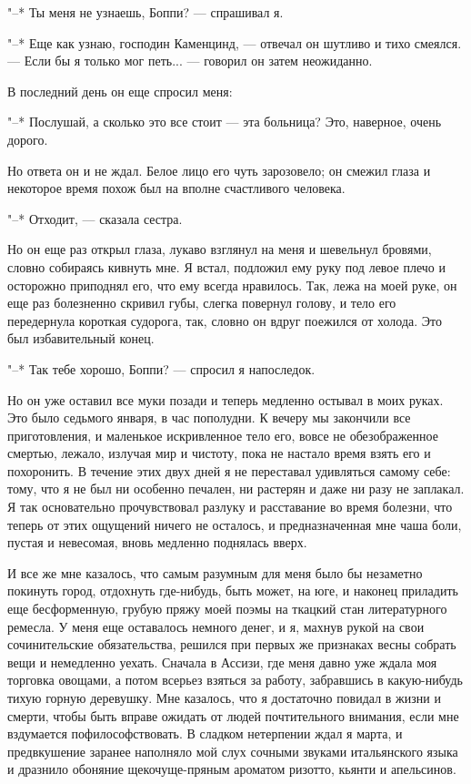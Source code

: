 "--* Ты меня не узнаешь, Боппи? --- спрашивал я.

"--* Еще как узнаю, господин Каменцинд,  --- отвечал он шутливо и тихо
смеялся.  --- Если  бы  я  только мог  петь...  ---  говорил он  затем
неожиданно.

В последний день он еще спросил меня:

"--*  Послушай,  а  сколько  это  все стоит  ---  эта  больница?  Это,
наверное, очень дорого.

Но ответа  он и  не ждал.  Белое лицо его  чуть зарозовело;  он смежил
глаза и некоторое время похож был на вполне счастливого человека.

"--* Отходит, --- сказала сестра.

Но  он еще  раз  открыл глаза,  лукаво взглянул  на  меня и  шевельнул
бровями, словно собираясь кивнуть мне.  Я встал, подложил ему руку под
левое плечо и осторожно приподнял  его, что ему всегда нравилось. Так,
лежа на моей руке, он еще раз болезненно скривил губы, слегка повернул
голову, и тело его передернула короткая судорога, так, словно он вдруг
поежился от холода. Это был избавительный конец.

"--* Так тебе хорошо, Боппи? --- спросил я напоследок.

Но он  уже оставил все  муки позади и  теперь медленно остывал  в моих
руках.  Это  было  седьмого  января,  в час  пополудни.  К  вечеру  мы
закончили все приготовления, и  маленькое искривленное тело его, вовсе
не  обезображенное смертью,  лежало, излучая  мир и  чистоту, пока  не
настало время  взять его и похоронить.  В течение этих двух  дней я не
переставал  удивляться самому  себе: тому,  что я  не был  ни особенно
печален, ни  растерян и даже ни  разу не заплакал. Я  так основательно
прочувствовал разлуку  и расставание во  время болезни, что  теперь от
этих ощущений  ничего не  осталось, и  предназначенная мне  чаша боли,
пустая и невесомая, вновь медленно поднялась вверх.

И все же  мне казалось, что самым разумным для  меня было бы незаметно
покинуть город,  отдохнуть где-нибудь, быть  может, на юге,  и наконец
приладить еще  бесформенную, грубую пряжу  моей поэмы на  ткацкий стан
литературного  ремесла. У  меня  еще оставалось  немного  денег, и  я,
махнув рукой на свои  сочинительские обязательства, решился при первых
же  признаках  весны  собрать  вещи и  немедленно  уехать.  Сначала  в
Ассизи,  где  меня давно  уже  ждала  моя  торговка овощами,  а  потом
всерьез  взяться за  работу,  забравшись в  какую-нибудь тихую  горную
деревушку. Мне  казалось, что я  достаточно повидал в жизни  и смерти,
чтобы быть  вправе ожидать от  людей почтительного внимания,  если мне
вздумается  пофилософствовать. В  сладком нетерпении  ждал я  марта, и
предвкушение заранее  наполняло мой слух сочными  звуками итальянского
языка и  дразнило обоняние щекочуще-пряным ароматом  ризотто, кьянти и
апельсинов.

